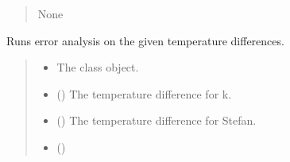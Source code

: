 \documentclass[a4paper,11pt,english,openany]{sphinxmanual}
\begin{document}
\begin{fulllineitems}
\begin{fulllineitems}
\begin{quote}
\begin{description}
\begin{itemize}
\end{itemize}

\sphinxAtStartPar
None

\end{description}\end{quote}

\end{fulllineitems}


\begin{fulllineitems}
\label{\detokenize{api/spyice.postprocess.analysis:src.spyice.postprocess.analysis.Analysis.get_error_results}}
\pysigstartsignatures
\pysiglinewithargsret
{}
{\sphinxparamcomma {}\sphinxparamcomma {}\sphinxparamcomma {}\sphinxparamcomma {}\sphinxparamcomma {}\sphinxparamcomma {}}
{}
\pysigstopsignatures
\sphinxAtStartPar
Runs error analysis on the given temperature differences.
\begin{quote}\begin{description}
\begin{itemize}
\item {} 
\sphinxAtStartPar
{} \textendash{} The class object.

\item {} 
\sphinxAtStartPar
{} () \textendash{} The temperature difference for k.

\item {} 
\sphinxAtStartPar
{} () \textendash{} The temperature difference for Stefan.

\item {} 
\sphinxAtStartPar
{} ()


\end{itemize}
\end{description}
\end{quote}
\end{fulllineitems}
\end{fulllineitems}
\end{document}
